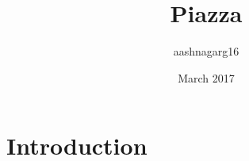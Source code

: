 \documentclass{article}
\title{Piazza}
\author{aashnagarg16 }
\date{March 2017}
\begin{document}
\maketitle

\section{Introduction}
\end{document}
